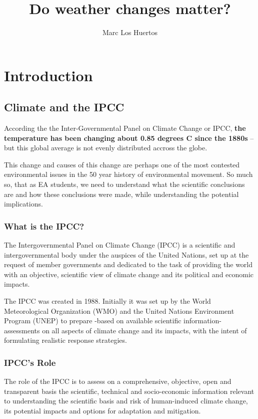 \documentclass{article}\usepackage[]{graphicx}\usepackage[]{color}
\title{Do weather changes matter?}
\author{Marc Los Huertos}
\begin{document}
\maketitle
\tableofcontents

\section{Introduction}

\subsection{Climate and the IPCC}

According the the Inter-Governmental Panel on Climate Change or IPCC, \textbf{the temperature has been changing about 0.85 degrees C since the  1880s} -- but this global average is not evenly distributed accross the globe. 

This change and causes of this change are perhaps one of the most contested environmental issues in the 50 year history of environmental movement. So much so, that as EA students, we need to understand what the scientific conclusions are and how these conclusions were made, while understanding the potential implications.

\subsubsection{What is the IPCC?}

The Intergovernmental Panel on Climate Change (IPCC) is a scientific and intergovernmental body under the auspices of the United Nations, set up at the request of member governments and dedicated to the task of providing the world with an objective, scientific view of climate change and its political and economic impacts.

The IPCC was created in 1988. Initially it was set up by the World Meteorological Organization (WMO) and the United Nations Environment Program (UNEP) to prepare -based on available scientific information-  assessments on all aspects of climate change and its impacts, with the intent of formulating realistic response strategies. 

\subsubsection{IPCC's Role}

The role of the IPCC is to assess on a comprehensive, objective, open and transparent basis the scientific, technical and socio-economic information relevant to understanding the scientific basis and risk of human-induced climate change, its potential impacts and options for adaptation and mitigation.
\end{document}
